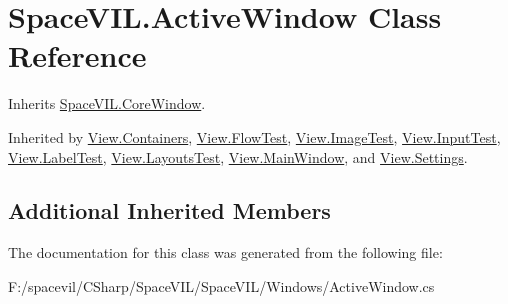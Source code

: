 \hypertarget{class_space_v_i_l_1_1_active_window}{}\section{Space\+V\+I\+L.\+Active\+Window Class Reference}
\label{class_space_v_i_l_1_1_active_window}


Inherits \mbox{\hyperlink{class_space_v_i_l_1_1_core_window}{Space\+V\+I\+L.\+Core\+Window}}.



Inherited by \mbox{\hyperlink{class_view_1_1_containers}{View.\+Containers}}, \mbox{\hyperlink{class_view_1_1_flow_test}{View.\+Flow\+Test}}, \mbox{\hyperlink{class_view_1_1_image_test}{View.\+Image\+Test}}, \mbox{\hyperlink{class_view_1_1_input_test}{View.\+Input\+Test}}, \mbox{\hyperlink{class_view_1_1_label_test}{View.\+Label\+Test}}, \mbox{\hyperlink{class_view_1_1_layouts_test}{View.\+Layouts\+Test}}, \mbox{\hyperlink{class_view_1_1_main_window}{View.\+Main\+Window}}, and \mbox{\hyperlink{class_view_1_1_settings}{View.\+Settings}}.

\subsection*{Additional Inherited Members}


The documentation for this class was generated from the following file\+:\begin{DoxyCompactItemize}
\item 
F\+:/spacevil/\+C\+Sharp/\+Space\+V\+I\+L/\+Space\+V\+I\+L/\+Windows/Active\+Window.\+cs\end{DoxyCompactItemize}
